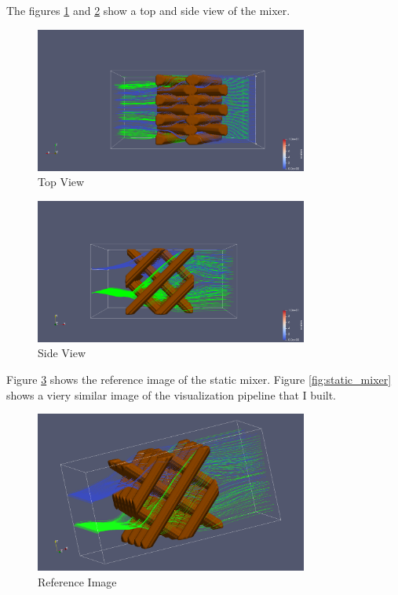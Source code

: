 \documentclass{article}
\begin{document}
The figures \ref{fig:top-view} and \ref{fig:side-view} show a top and side view of the mixer.

\begin{figure}[H]
    \centering
    \includegraphics[width=0.8\textwidth]{top-view.png}
    \caption{Top View}
    \label{fig:top-view}
\end{figure}

\begin{figure}[H]
    \centering
    \includegraphics[width=0.8\textwidth]{side-view.png}
    \caption{Side View}
    \label{fig:side-view}
\end{figure}

Figure \ref{fig:reference} shows the reference image of the static mixer. Figure \ref{fig:static_mixer} shows a viery similar image of the visualization pipeline that I built.


\begin{figure}[H]
    \centering
    \includegraphics[width=0.8\textwidth]{reference.png}
    \caption{Reference Image}
    \label{fig:reference}
\end{figure}
\end{document}
